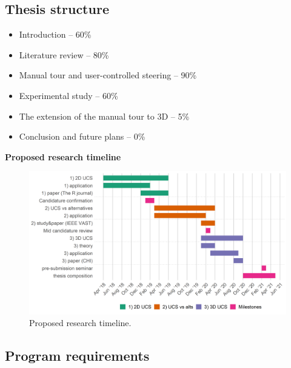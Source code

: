 \documentclass[
  11,
]{article}
\providecommand{\tightlist}{%
  \setlength{\itemsep}{0pt}\setlength{\parskip}{0pt}}
\begin{document}
\hypertarget{thesis-structure}{%
\subsection{Thesis structure}\label{thesis-structure}}

\begin{itemize}
\tightlist
\item
  Introduction -- 60\%
\item
  Literature review -- 80\%
\item
  Manual tour and user-controlled steering -- 90\%
\item
  Experimental study -- 60\%
\item
  The extension of the manual tour to 3D -- 5\%
\item
  Conclusion and future plans -- 0\%
\end{itemize}

\textbf{Proposed research timeline}

\begin{figure}[h]

{\centering \includegraphics[width=1\linewidth,]{figures/phd_timeline} 

}

\caption{Proposed research timeline.}\label{fig:timeline}
\end{figure}

\hypertarget{program-requirements}{%
\subsection{Program requirements}\label{program-requirements}}
\end{document}
